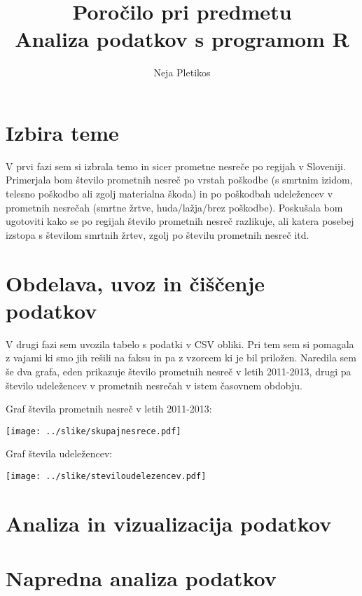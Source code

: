 \documentclass[11pt,a4paper]{article}
\begin{document}
\title{Poročilo pri predmetu \\
Analiza podatkov s programom R}
\author{Neja Pletikos}
\maketitle

\section{Izbira teme}

V prvi fazi sem si izbrala temo in sicer prometne nesreče po regijah v Sloveniji. Primerjala bom število prometnih nesreč po vrstah poškodbe (s smrtnim izidom, telesno poškodbo ali zgolj materialna škoda) in po poškodbah udeležencev v prometnih nesrečah (smrtne žrtve, huda/lažja/brez poškodbe). Poskušala bom ugotoviti kako se po regijah število prometnih nesreč razlikuje, ali katera posebej izstopa s številom smrtnih žrtev, zgolj po številu prometnih nesreč itd.

\section{Obdelava, uvoz in čiščenje podatkov}

V drugi fazi sem uvozila tabelo s podatki v CSV obliki. Pri tem sem si pomagala z vajami ki smo jih rešili na faksu in pa z vzorcem ki je bil priložen. Naredila sem še dva grafa, eden prikazuje število prometnih nesreč v letih 2011-2013, drugi pa število udeležencev v prometnih nesrečah v istem časovnem obdobju.

Graf števila prometnih nesreč v letih 2011-2013:

\texttt{[image: ../slike/skupajnesrece.pdf]}

Graf števila udeležencev:

\texttt{[image: ../slike/steviloudelezencev.pdf]}

\section{Analiza in vizualizacija podatkov}


\section{Napredna analiza podatkov}
\end{document}
